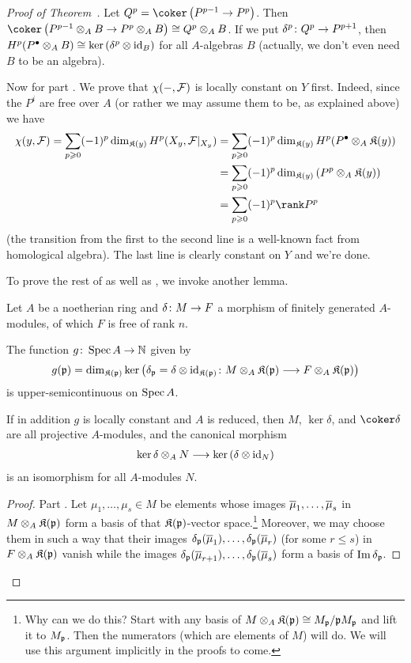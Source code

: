 \documentclass[a4paper,parskip=half,numbers=enddot, DIV=12]{scrreprt}
\renewcommand{\geq}{\geqslant}
\renewcommand{\leq}{\leqslant}
\begin{document}
\begin{proof}[Proof of Theorem~]
	Let $Q^p=\coker\left(P^{p-1}\morphism P^p\right)$. Then $\coker\left(P^{p-1}\otimes_AB\morphism P^p\otimes_AB\right)\cong Q^p\otimes_AB$. If we put $\delta^p\colon Q^p\morphism P^{p+1}$, then $H^p(P^\bullet\otimes_AB)\cong \ker\left(\delta^p\otimes\operatorname{id}_B\right)$ for all $A$-algebras $B$ (actually, we don't even need $B$ to be an algebra).
	
	Now for part . We prove that $\chi(-,\mathcal{F})$ is locally constant on $Y$ first. Indeed, since the $P^i$ are free over $A$ (or rather we may assume them to be, as explained above) we have
	\begin{align*}
		\chi(y,\Ff)=\sum_{p\geq 0}(-1)^p\dim_{\KK(y)}H^p(X_y,\Ff|_{X_y})&=\sum_{p\geq 0}(-1)^p\dim_{\KK(y)}H^p(P^\bullet\otimes_A\KK(y))\\
		&=\sum_{p\geq 0}(-1)^p\dim_{\KK(y)}\left(P^p\otimes_A\KK(y)\right)\\
		&=\sum_{p\geq 0}(-1)^p\rank P^p
	\end{align*}
	(the transition from the first to the second line is a well-known fact from homological algebra). The last line is clearly constant on $Y$ and we're done.
	
	To prove the rest of  as well as , we invoke another lemma.
	\begin{lem}
		Let $A$ be a noetherian ring and $\delta\colon M\morphism F$ a morphism of finitely generated $A$-modules, of which $F$ is free of rank $n$. 
		\begin{alphanumerate}
			\item The function $g\colon \Spec A\morphism\IN$ given by
			\begin{align*}
				g(\pp)=\dim_{\KK(\pp)}\ker\left(\delta_\pp=\delta\otimes\id_{\KK(\pp)}\colon M\otimes_A\KK(\pp)\morphism F\otimes_A\KK(\pp)\right)
			\end{align*}
			is upper-semicontinuous on $\operatorname{Spec} A$.
			\item If in addition $g$ is locally constant and $A$ is reduced, then $M$, $\ker\delta$, and $\coker\delta$ are all projective $A$-modules, and the canonical morphism
			\begin{align*}
				\ker\delta\otimes_AN\morphism\ker\left(\delta\otimes\id_N\right)
			\end{align*}
			is an isomorphism for all $A$-modules $N$.
		\end{alphanumerate}
	\end{lem}
	\begin{proof}
		Part . Let $\mu_1,\ldots,\mu_s\in M$ be elements whose images $\overline{\mu}_1,\ldots,\overline{\mu}_s$ in $M\otimes_A\mathfrak{K}(\mathfrak{p})$ form a basis of that $\mathfrak{K}(\mathfrak{p})$-vector space.\footnote{Why can we do this? Start with any basis of $M\otimes_A\mathfrak{K}(\mathfrak{p})\cong M_{\mathfrak{p}}/\mathfrak{p} M_{\mathfrak{p}}$ and lift it to $M_{\mathfrak{p}}$. Then the numerators (which are elements of $M$) will do. We will use this argument implicitly in the proofs to come.} Moreover, we may choose them in such a way that their images $\delta_{\mathfrak{p}}(\overline{\mu}_1),\ldots,\delta_{\mathfrak{p}}(\overline{\mu}_r)$ (for some $r\leq s$) in $F\otimes_A\mathfrak{K}(\mathfrak{p})$ vanish while the images $\delta_{\mathfrak{p}}(\overline{\mu}_{r+1}),\ldots,\delta_{\mathfrak{p}}(\overline{\mu}_s)$ form a basis of $\operatorname{Im}\delta_{\mathfrak{p}}$. 
		

\end{proof}
\end{proof}
\end{document}
